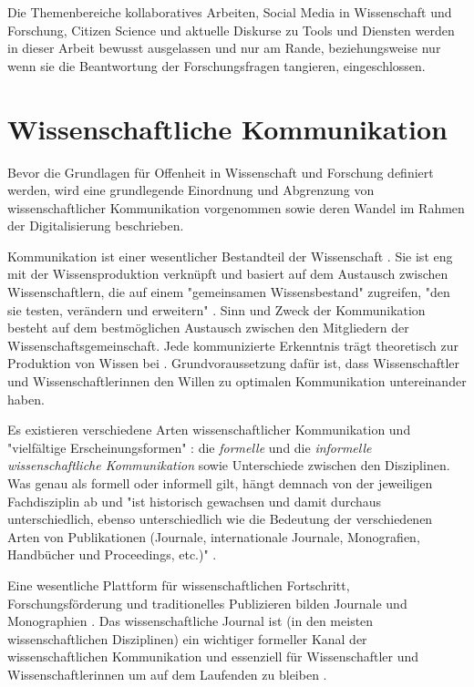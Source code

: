 Die Themenbereiche kollaboratives Arbeiten, Social Media in Wissenschaft und Forschung, Citizen Science und aktuelle Diskurse zu Tools und Diensten werden in dieser Arbeit bewusst ausgelassen und nur am Rande, beziehungsweise nur wenn sie die Beantwortung der Forschungsfragen tangieren, eingeschlossen.

\section{Wissenschaftliche Kommunikation}
Bevor die Grundlagen für Offenheit in Wissenschaft und Forschung definiert werden, wird eine grundlegende Einordnung und Abgrenzung von wissenschaftlicher Kommunikation vorgenommen sowie deren Wandel im Rahmen der Digitalisierung beschrieben.

Kommunikation ist einer wesentlicher Bestandteil der Wissenschaft \cite{garvey_2014_communication}. Sie ist eng mit der Wissensproduktion verknüpft und basiert auf dem Austausch zwischen Wissenschaftlern, die auf einem "gemeinsamen Wissensbestand" zugreifen, "den sie testen, verändern und erweitern" \cite{Gl_ser_2007}. Sinn und Zweck der Kommunikation besteht auf dem bestmöglichen Austausch zwischen den Mitgliedern der Wissenschaftsgemeinschaft. Jede kommunizierte Erkenntnis trägt theoretisch zur Produktion von Wissen bei \cite{kaden_2009_library}. Grundvoraussetzung dafür ist, dass Wissenschaftler und Wissenschaftlerinnen den Willen zu optimalen Kommunikation untereinander haben.

Es existieren verschiedene Arten wissenschaftlicher Kommunikation und "vielfältige Erscheinungsformen" \cite{graefen2007_wissenschaftliche_artikel}: die \textit{formelle} und die \textit{informelle wissenschaftliche Kommunikation} sowie Unterschiede zwischen den Disziplinen. Was genau als formell oder informell gilt, hängt demnach von der jeweiligen Fachdisziplin ab und "ist historisch gewachsen und damit durchaus unterschiedlich, ebenso unterschiedlich wie die Bedeutung der verschiedenen Arten von Publikationen (Journale, internationale Journale, Monografien, Handbücher und Proceedings, etc.)" \cite{Hanekop_2014}.

Eine wesentliche Plattform für wissenschaftlichen Fortschritt, Forschungsförderung und traditionelles Publizieren bilden Journale und Monographien \cite{cope2014future}. Das wissenschaftliche Journal ist (in den meisten wissenschaftlichen Disziplinen) ein wichtiger formeller Kanal der wissenschaftlichen Kommunikation und essenziell für Wissenschaftler und Wissenschaftlerinnen um auf dem Laufenden zu bleiben \cite{cope2014future}.

